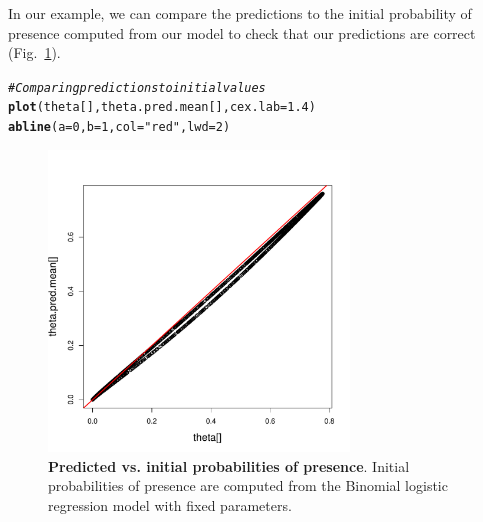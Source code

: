 \documentclass[a4paper, 12pt, leqno]{article}\usepackage[]{graphicx}\usepackage[]{color}
\makeatletter
\newcommand{\hlnum}[1]{\textcolor[rgb]{0.686,0.059,0.569}{#1}}%
\newcommand{\hlstr}[1]{\textcolor[rgb]{0.192,0.494,0.8}{#1}}%
\newcommand{\hlcom}[1]{\textcolor[rgb]{0.678,0.584,0.686}{\textit{#1}}}%
\newcommand{\hlstd}[1]{\textcolor[rgb]{0.345,0.345,0.345}{#1}}%
\newcommand{\hlkwc}[1]{\textcolor[rgb]{0.333,0.667,0.333}{#1}}%
\newcommand{\hlkwd}[1]{\textcolor[rgb]{0.737,0.353,0.396}{\textbf{#1}}}%
\newenvironment{kframe}{%
 \def\at@end@of@kframe{}%
 \ifinner\ifhmode%
  \def\at@end@of@kframe{\end{minipage}}%
  \begin{minipage}{\columnwidth}%
 \fi\fi%
 \def\FrameCommand##1{\hskip\@totalleftmargin \hskip-\fboxsep
 \colorbox{shadecolor}{##1}\hskip-\fboxsep
     \hskip-\linewidth \hskip-\@totalleftmargin \hskip\columnwidth}%
 \MakeFramed {\advance\hsize-\width
   \@totalleftmargin\z@ \linewidth\hsize
   \@setminipage}}%
 {\par\unskip\endMakeFramed%
 \at@end@of@kframe}
\newenvironment{knitrout}{}{} %
\makeatother
\begin{document}
In our example, we can compare the predictions to the initial probability of presence
computed from our model to check that our predictions are correct
(Fig.~\ref{fig:pred-obs-binomial}).

\begin{knitrout}\small
{}\color{fgcolor}\begin{kframe}
\begin{alltt}
\hlcom{# Comparing predictions to initial values}
\hlkwd{plot}\hlstd{(theta[],theta.pred.mean[],}\hlkwc{cex.lab}\hlstd{=}\hlnum{1.4}\hlstd{)}
\hlkwd{abline}\hlstd{(}\hlkwc{a}\hlstd{=}\hlnum{0}\hlstd{,}\hlkwc{b}\hlstd{=}\hlnum{1}\hlstd{,}\hlkwc{col}\hlstd{=}\hlstr{"red"}\hlstd{,}\hlkwc{lwd}\hlstd{=}\hlnum{2}\hlstd{)}
\end{alltt}
\end{kframe}
\end{knitrout}


\begin{figure}[!h] 
  \centering \includegraphics[width=8cm]{figures/pred-obs-binomial.pdf}
  
  \caption{\textbf{Predicted vs. initial probabilities of presence}. Initial probabilities
    of presence are computed from the Binomial logistic regression model with fixed
    parameters.}
  
  \label{fig:pred-obs-binomial}
  
\end{figure}
\end{document}
